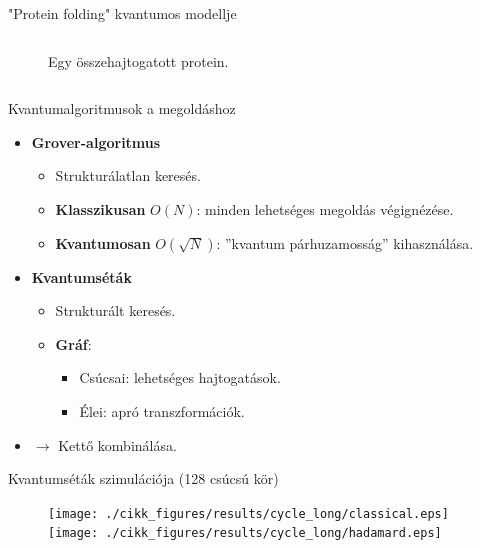 \documentclass[aspectratio=169]{beamer}
\begin{document}
\begin{frame}{"Protein folding" kvantumos modellje}
\begin{columns}
\begin{column}{0.45\textwidth}
\begin{figure}[H]
\caption{Egy összehajtogatott protein.\footnotemark}
\end{figure}
\end{column}
\end{columns}


\end{frame}

\begin{frame}{Kvantumalgoritmusok a megoldáshoz}
\begin{itemize}
    \item \textbf{Grover-algoritmus}
    \begin{itemize}
        \item Strukturálatlan keresés.
        \item \textbf{Klasszikusan} $O(N)$: minden lehetséges megoldás végignézése.
        \item \textbf{Kvantumosan} $O(\sqrt{N})$: ''kvantum párhuzamosság'' kihasználása. 
    \end{itemize}
    \item \textbf{Kvantumséták}
    \begin{itemize}
        \item Strukturált keresés.
        \item \textbf{Gráf}:
        \begin{itemize}
            \item Csúcsai: lehetséges hajtogatások.
            \item Élei: apró transzformációk.
        \end{itemize}
    \end{itemize}
   \item $\rightarrow$ Kettő kombinálása.
\end{itemize}
\end{frame}

\begin{frame}{Kvantumséták szimulációja (128 csúcsú kör)}
\begin{figure}[H]
  \centering
  \texttt{[image: ./cikk\_figures/results/cycle\_long/classical.eps]}
  \texttt{[image: ./cikk\_figures/results/cycle\_long/hadamard.eps]}
\end{figure}
\end{frame}
\end{document}
